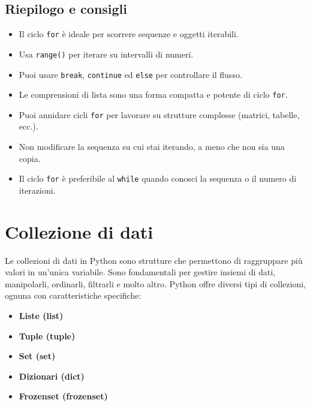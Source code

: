\documentclass[a4paper,12pt]{article}
\begin{document}
\subsection*{Riepilogo e consigli}
\begin{itemize}
    \item Il ciclo \texttt{for} è ideale per scorrere sequenze e oggetti iterabili.
    \item Usa \texttt{range()} per iterare su intervalli di numeri.
    \item Puoi usare \texttt{break}, \texttt{continue} ed \texttt{else} per controllare il flusso.
    \item Le comprensioni di lista sono una forma compatta e potente di ciclo \texttt{for}.
    \item Puoi annidare cicli \texttt{for} per lavorare su strutture complesse (matrici, tabelle, ecc.).
    \item Non modificare la sequenza su cui stai iterando, a meno che non sia una copia.
    \item Il ciclo \texttt{for} è preferibile al \texttt{while} quando conosci la sequenza o il numero di iterazioni.
\end{itemize}

\begin{center}
\end{center}

\section{Collezione di dati}
Le collezioni di dati in Python sono strutture che permettono di raggruppare più valori in un'unica variabile. Sono fondamentali per gestire insiemi di dati, manipolarli, ordinarli, filtrarli e molto altro. Python offre diversi tipi di collezioni, ognuna con caratteristiche specifiche:

\begin{itemize}
    \item \textbf{Liste (list)}
    \item \textbf{Tuple (tuple)}
    \item \textbf{Set (set)}
    \item \textbf{Dizionari (dict)}
    \item \textbf{Frozenset (frozenset)}
\end{itemize}
\end{document}
